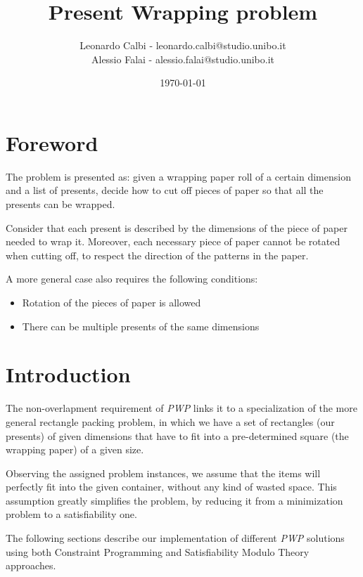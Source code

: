 \documentclass[a4paper,10pt]{article}
\begin{document}
%
\title{Present Wrapping problem}

\author{Leonardo Calbi - leonardo.calbi@studio.unibo.it \\ Alessio Falai - alessio.falai@studio.unibo.it}

\date{\today}

\maketitle

\tableofcontents

\newpage

\section*{Foreword}
The problem is presented as: given a wrapping paper roll of a certain dimension and a list of presents, decide how to cut off pieces of paper so  that all the presents can be wrapped.

Consider that each present is described by the dimensions of the piece of paper needed to wrap it. Moreover, each necessary piece of paper cannot be rotated when cutting off, to respect the direction of the patterns in the paper.

A more general case also requires the following conditions:
\begin{itemize}
   \item Rotation of the pieces of paper is allowed
   \item There can be multiple presents of the same dimensions
\end{itemize}

\section{Introduction}
The non-overlapment requirement of \emph{PWP} links it to a specialization of the more general rectangle packing problem, in which we have a set of rectangles (our presents) of given dimensions that have to fit into a pre-determined square (the wrapping paper) of a given size.

Observing the assigned problem instances, we assume that the items will perfectly fit into the given container, without any kind of wasted space. This assumption greatly simplifies the problem, by reducing it from a minimization problem to a satisfiability one.

The following sections describe our implementation of different \emph{PWP} solutions using both Constraint Programming and Satisfiability Modulo Theory approaches.
\end{document}
